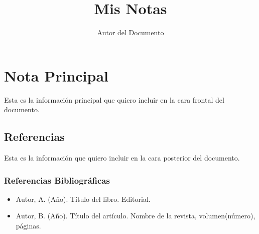 \documentclass[
  10pt,
]{article}
\title{Mis Notas}
\author{Autor del Documento}
\date{}
\providecommand{\tightlist}{%
  \setlength{\itemsep}{0pt}\setlength{\parskip}{0pt}}
\begin{document}
\maketitle

\title{}
\author{}
\date{}

\maketitle

\hypertarget{nota-principal}{%
\section{Nota Principal}\label{nota-principal}}

Esta es la información principal que quiero incluir en la cara frontal
del documento.

\newpage

\hypertarget{referencias}{%
\subsection{Referencias}\label{referencias}}

Esta es la información que quiero incluir en la cara posterior del
documento.

\hypertarget{referencias-bibliogruxe1ficas}{%
\subsubsection{Referencias
Bibliográficas}\label{referencias-bibliogruxe1ficas}}

\begin{itemize}
\tightlist
\item
  Autor, A. (Año). Título del libro. Editorial.
\item
  Autor, B. (Año). Título del artículo. Nombre de la revista,
  volumen(número), páginas.
\end{itemize}
\end{document}

